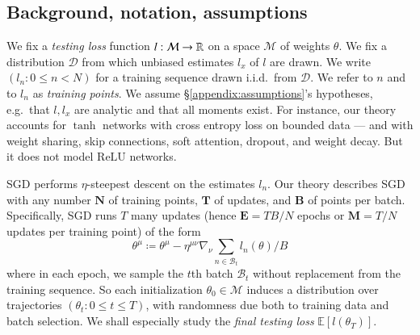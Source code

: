 \documentclass[anon,12pt]{colt2021} %
\newcommand{\expc}{\mathbb{E}}
\newcommand{\Bb}{\mathcal{B}}
\newcommand{\Dd}{\mathcal{D}}
\newcommand{\Mm}{\mathcal{M}}
\begin{document}
        \newpage
        \subsection{Background, notation, assumptions}

    
            We fix a \emph{testing loss} function $l:\Mm\to\RR$ on a space
            $\Mm$ of weights $\theta$.  We fix a distribution $\Dd$ from which
            unbiased estimates $l_x$ of $l$ are drawn.  We write $(l_n:
            0\leq n<N)$ for a training sequence drawn i.i.d.\ from $\Dd$.  We
            refer to $n$ and to $l_n$ as \emph{training points}.  We assume
            \S\ref{appendix:assumptions}'s hypotheses, e.g.\ that $l, l_x$ are
            analytic and that all moments exist.
            For instance, our theory accounts for $\tanh$ networks with cross
            entropy loss on bounded data --- and with weight sharing, skip
            connections, soft attention, dropout, and weight decay.  But it
            does not model $\text{ReLU}$ networks.


            SGD performs $\eta$-steepest descent on the estimates $l_n$.  Our
            theory describes SGD with any number
                $\mathbf{N}$ of training points,
                $\mathbf{T}$ of updates, and 
                $\mathbf{B}$ of points per batch.
            Specifically, SGD runs $T$ many updates (hence
                $\mathbf{E}=TB/N$ epochs or
                $\mathbf{M}=T/N$ updates per training point) of the form
            $$
                \textstyle
                \theta^\mu
                \coloneqq
                \theta^\mu -
                \eta^{\mu\nu} \nabla_\nu
                    \sum_{n\in \Bb_t} l_n(\theta) / B
            $$
            where in each epoch, we sample the $t$th batch $\Bb_t$ without
            replacement from the training sequence.  So each initialization
            $\theta_0 \in \Mm$ induces a distribution over
            trajectories $(\theta_t: 0\leq t \leq T)$, with randomness due both
            to training data and batch selection.  We shall especially study
            the \emph{final testing loss} $\expc[l(\theta_T)]$.
\end{document}
